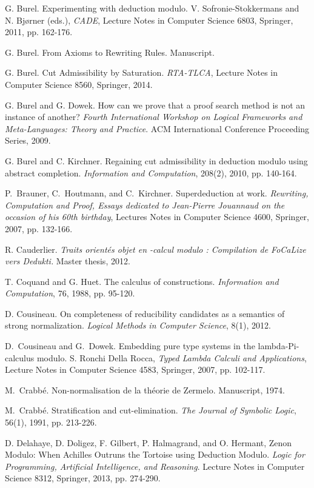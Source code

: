 \documentclass{llncs}
\begin{document}
\begin{thebibliography}{99.}
G. Burel. 
Experimenting with deduction modulo.
V. Sofronie-Stokkermans and N. Bj\o rner (eds.), 
{\em CADE}, 
Lecture Notes in Computer Science 6803, Springer, 2011, pp. 162-176. 

G. Burel. 
From Axioms to Rewriting Rules. 
Manuscript.

G. Burel. 
Cut Admissibility by Saturation.  
{\em RTA-TLCA}, Lecture Notes in Computer Science 8560, Springer, 2014.

G. Burel and G. Dowek.
How can we prove that a proof search method is not an instance of another? 
{\em Fourth International Workshop on
Logical Frameworks and Meta-Languages: Theory and Practice}.
ACM International Conference Proceeding Series, 2009.

G. Burel and C. Kirchner. 
Regaining cut admissibility in deduction modulo using abstract completion. 
{\em Information and Computation}, 208(2), 2010, pp. 140-164.

P.~Brauner, C.~Houtmann, and C.~Kirchner.
Superdeduction at work. 
{\em Rewriting, Computation and Proof, Essays dedicated to Jean-Pierre
Jouannaud on the occasion of his 60th birthday}, 
Lectures Notes in Computer Science 4600, Springer, 2007, pp. 132-166.

R. Cauderlier.
{\em Traits orientés objet en -calcul modulo :
Compilation de FoCaLize vers Dedukti.}
Master thesis, 2012.

T. Coquand and G. Huet.
The calculus of constructions.
{\em Information and Computation}, 76, 1988, pp. 95-120.

D. Cousineau.
On completeness of reducibility candidates as a semantics of strong 
normalization. 
{\em Logical Methods in Computer Science}, 8(1), 2012.

D.~Cousineau and G.~Dowek. 
Embedding pure type systems in the lambda-Pi-calculus modulo. 
S. Ronchi Della Rocca, {\em Typed Lambda Calculi and
Applications}, Lecture Notes in Computer Science 4583, Springer,
2007, pp. 102-117.

M.~Crabb\'e.
Non-normalisation de la th\'eorie de Zermelo.
Manuscript, 1974.

M.~Crabb\'e.
Stratification and cut-elimination.
{\em The Journal of Symbolic Logic}, 56(1), 1991, pp. 213-226.


D. Delahaye, D. Doligez, F. Gilbert, P. Halmagrand, and O. Hermant, 
Zenon Modulo: When Achilles Outruns the Tortoise using Deduction Modulo.
{\em Logic for Programming, Artificial Intelligence, and Reasoning}.
Lecture Notes in Computer Science 8312, Springer, 2013, pp. 274-290.



\end{thebibliography}
\end{document}
